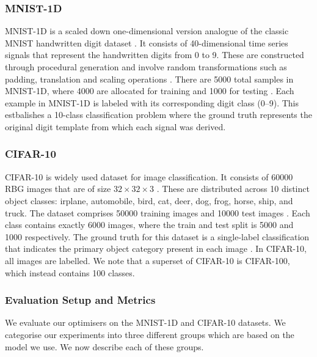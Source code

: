 \subsubsection{MNIST-1D}
\label{sssec:task_3_mnist_1d}
MNIST-1D is a scaled down one-dimensional version analogue of the classic MNIST handwritten digit dataset \citep{greydanus_mnist1d}. It consists of 40-dimensional time series signals that represent the handwritten digits from 0 to 9. These are constructed through procedural generation and involve random transformations such as padding, translation and scaling operations \citep{greydanus_mnist1d}. There are 5000 total samples in MNIST-1D, where 4000 are allocated for training and 1000 for testing \citep{greydanus_mnist1d}. Each example in MNIST-1D is labeled with its corresponding digit class (0--9). This estbalishes a 10-class classification problem where the ground truth represents the original digit template from which each signal was derived.

\subsubsection{CIFAR-10}
\label{sssec:task_3_cifar_10}
CIFAR-10 is widely used dataset for image classification. It consists of 60000 RBG images that are of size $32 \times 32 \times 3$ \citep{cifar10}. These are distributed across 10 distinct object classes: irplane, automobile, bird, cat, deer, dog, frog, horse, ship, and truck. The dataset comprises 50000 training images and 10000 test images \citep{cifar10}. Each class contains exactly 6000 images, where the train and test split is 5000 and 1000 respectively. The ground truth for this dataset is a single-label classification that indicates the primary object category present in each image \citep{cifar10}. In CIFAR-10, all images are labelled. We note that a superset of CIFAR-10 is CIFAR-100, which instead contains 100 classes. 

\subsubsection{Evaluation Setup and Metrics}
We evaluate our optimisers on the MNIST-1D and CIFAR-10 datasets. We categorise our experiments into three different groups which are based on the model we use. We now describe each of these groups.

